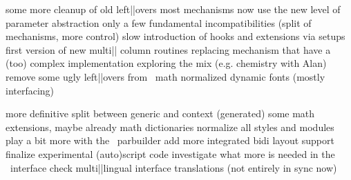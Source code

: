 \enablemode[print]


\definecolor[maincolor] [darkgray]
\definecolor[othercolor][r=.3,b=.3]


\startdocument
  [title={Bits and pieces:\\\\ConTeXt\\MetaPost\\Lua and more},
   subtitle={Hans Hagen\\EuroBacho\TeX\\May 2013}]

\StartSteps

\starttopic[title={ConTeXt\\recently done}]

    \startitemize
        \startitem some more cleanup of old left||overs \FlushStep \stopitem
        \startitem most mechanisms now use the new level of parameter abstraction \FlushStep \stopitem
        \startitem only a few fundamental incompatibilities (split of mechanisms, more control) \FlushStep \stopitem
        \startitem slow introduction of hooks and extensions via setups \FlushStep \stopitem
        \startitem first version of new multi|| column routines \FlushStep \stopitem
        \startitem replacing mechanism that have a (too) complex implementation \FlushStep \stopitem
        \startitem exploring the mix (e.g. chemistry with Alan) \FlushStep \stopitem
        \startitem remove some ugly left||overs from \MKII\ math \FlushStep \stopitem
        \startitem normalized dynamic fonts (mostly interfacing) \FlushStep \stopitem
    \stopitemize

\stoptopic

\StopSteps

\StartSteps

\starttopic[title={ConTeXt\\next on the todo list}]

    \startitemize
        \startitem more definitive split between generic and context (generated) \FlushStep \stopitem
        \startitem some math extensions, maybe already math dictionaries \FlushStep \stopitem
        \startitem normalize all styles and modules \FlushStep \stopitem
        \startitem play a bit more with the \LUA\ parbuilder \FlushStep \stopitem
        \startitem add more integrated bidi layout support \FlushStep \stopitem
        \startitem finalize experimental (auto)script code \FlushStep \stopitem
        \startitem investigate what more is needed in the \CLD\ interface \FlushStep \stopitem
        \startitem check multi||lingual interface translations (not entirely in sync now) \FlushStep \stopitem
    \stopitemize

